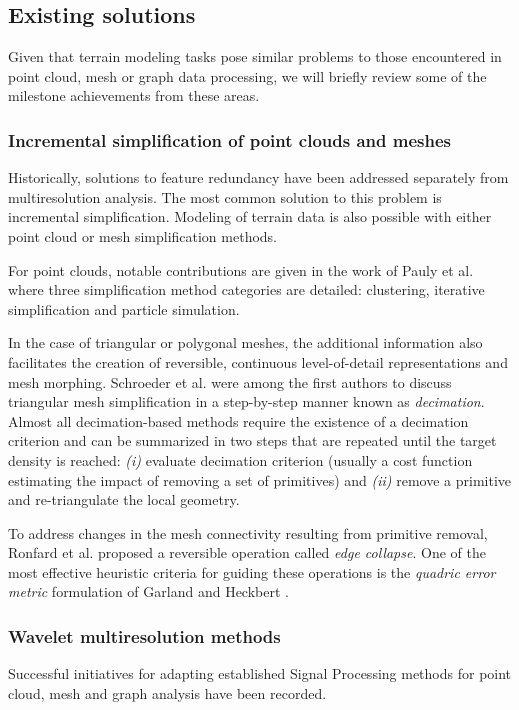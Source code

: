 \documentclass[graybox]{svmult}
\begin{document}
\subsection{Existing solutions}
Given that terrain modeling tasks pose similar problems to those encountered in point cloud, mesh or graph data processing, we will briefly review some of the milestone achievements from these areas.

\subsubsection{Incremental simplification of point clouds and meshes}
Historically, solutions to feature redundancy have been addressed separately from multiresolution analysis. The most common solution to this problem is incremental simplification. Modeling of terrain data is also possible with either point cloud or mesh simplification methods.

For point clouds, notable contributions are given in the work of
Pauly et al.  \cite{Pauly2002} where three simplification method categories are detailed: clustering, iterative simplification and particle simulation.

In the case of triangular or polygonal meshes, the additional information
also facilitates the creation of reversible, continuous level-of-detail representations and mesh morphing. Schroeder et al. \cite{Schroeder1992} were among the first authors to discuss triangular mesh simplification in a step-by-step manner known as \emph{decimation}. Almost all decimation-based methods require the existence of a decimation criterion and can be summarized in two steps that are repeated until the target density is reached:
\emph{(i)} evaluate decimation criterion (usually a cost function estimating the impact of removing a set of primitives) and \emph{(ii)} remove a primitive and re-triangulate the local geometry.

To address changes in the mesh connectivity resulting from primitive removal, Ronfard et al. \cite{Ronfard1996} proposed a reversible operation called \emph{edge collapse}. One of the most effective heuristic criteria for guiding these operations is the \emph{quadric error metric} formulation of Garland and Heckbert \cite{Garland1998}.

\subsubsection{Wavelet multiresolution methods}
Successful initiatives for adapting established Signal Processing methods for
point cloud, mesh and graph analysis have been recorded. 
\end{document}
